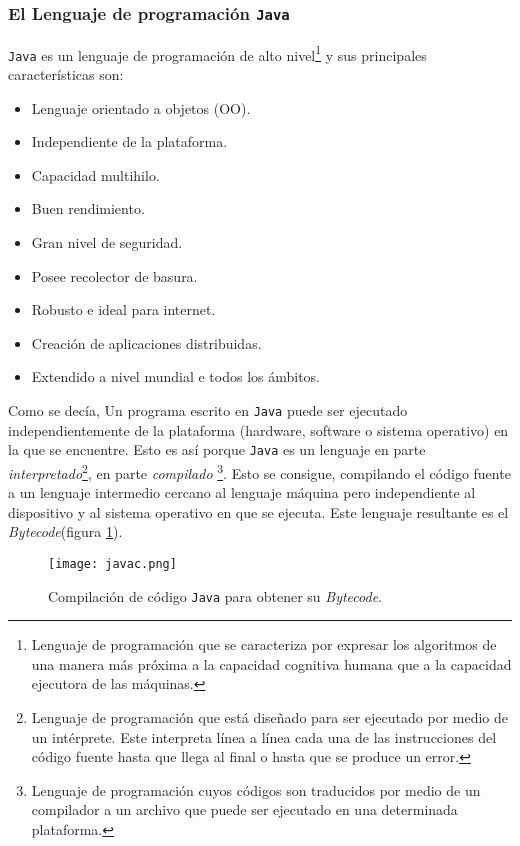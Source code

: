   \subsubsection{El Lenguaje de programación \texttt{Java}}
\texttt{Java} es un lenguaje de programación de alto nivel\footnote{Lenguaje
de programación que se caracteriza por expresar los algoritmos de una manera
más próxima a la capacidad cognitiva humana que a la capacidad ejecutora de
las máquinas.} y sus principales características son:
  \begin{itemize}
  \item Lenguaje orientado a objetos (\acs{OO}).
  \item Independiente de la plataforma.
  \item Capacidad multihilo.
  \item Buen rendimiento.
  \item Gran nivel de seguridad.
  \item Posee recolector de basura.
  \item Robusto e ideal para internet.
  \item Creación de aplicaciones distribuidas.
  \item Extendido a nivel mundial e todos los ámbitos.
  \end{itemize}

Como se decía, Un programa escrito en \texttt{Java} puede ser ejecutado
independientemente de la plataforma (hardware, software o sistema operativo)
en la que se encuentre. Esto es así porque \texttt{Java} es un lenguaje en
parte \emph{interpretado}\footnote{Lenguaje de programación que está diseñado
para ser ejecutado por medio de un intérprete. Este interpreta línea
a línea cada una de las instrucciones del código fuente hasta que llega al
final o hasta que se produce un error.}, en parte \emph{compilado}
\footnote{Lenguaje de programación cuyos códigos son traducidos por medio de un 
compilador a un archivo que puede ser ejecutado en una determinada 
plataforma.}. Esto se consigue, compilando el código fuente a un lenguaje 
intermedio cercano al lenguaje máquina pero independiente al dispositivo y al 
sistema operativo en que se ejecuta. Este lenguaje resultante es el
\emph{Bytecode}(figura \ref{fig:javac}).

  \begin{figure}[H]
    \begin{center}
      \texttt{[image: javac.png]}
      \caption{Compilación de código \texttt{Java} para obtener su 
      \emph{Bytecode}.}
      \label{fig:javac}
    \end{center}
  \end{figure}


